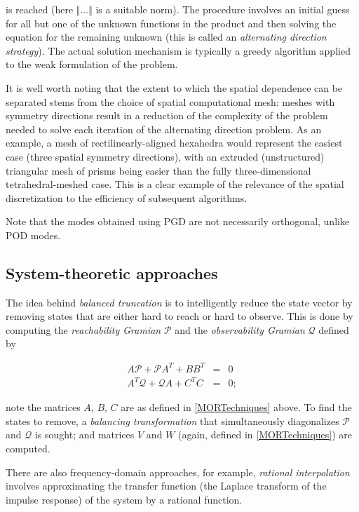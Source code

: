 is reached (here $\Vert ... \Vert$ is a suitable norm).  
The procedure involves an initial guess for all but one of the unknown functions in the product and then solving the equation for the remaining unknown (this is called an {\it alternating direction strategy}).  
The actual solution mechanism is typically a greedy algorithm applied to the weak formulation of the problem.

It is well worth noting that the extent to which the spatial dependence can be separated stems from the choice of spatial computational mesh: meshes with symmetry directions result in a reduction of the complexity of the problem needed to solve each iteration of the alternating direction problem.  
As an example, a mesh of rectilinearly-aligned hexahedra would represent the easiest case (three spatial symmetry directions), with an extruded (unstructured) triangular mesh of prisms being easier than the fully three-dimensional tetrahedral-meshed case.  
This is a clear example of the relevance of the spatial discretization to the efficiency of subsequent algorithms. 

Note that the modes obtained using PGD are not necessarily orthogonal, unlike POD modes.

\subsection{System-theoretic approaches}

The idea behind {\it balanced truncation} is to intelligently reduce the state vector by removing states that are either hard to reach or hard to observe.  
This is done by computing the {\it reachability Gramian} $\mathcal{P}$ and the {\it observability Gramian} $\mathcal{Q}$ defined by

\begin{eqnarray}
A \mathcal{P} + \mathcal{P} A^T + B B^T &=& 0\\
A^T \mathcal{Q} + \mathcal{Q} A + C^T C &=& 0; 
\end{eqnarray}

note the matrices $A$, $B$, $C$ are as defined in \ref{MORTechniques} above.  
To find the states to remove, a {\it balancing transformation} that simultaneously diagonalizes $\mathcal{P}$ and $\mathcal{Q}$ is sought; and matrices $V$ and $W$ (again, defined in \ref{MORTechniques}) are computed.

There are also frequency-domain approaches, for example, {\it rational interpolation} involves approximating the transfer function (the Laplace transform of the impulse response) of the system by a rational function.

